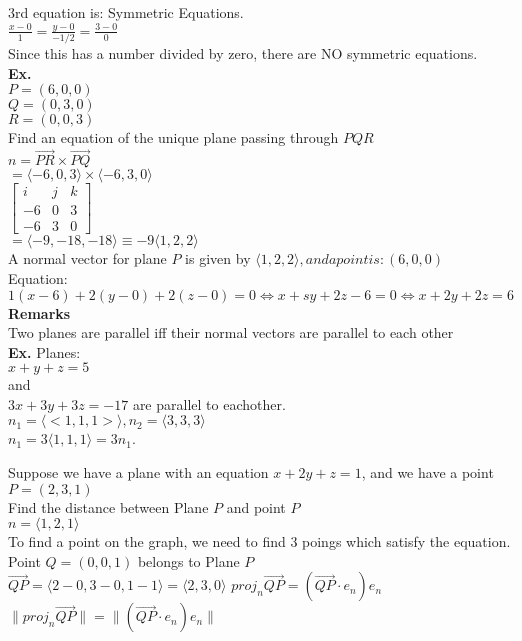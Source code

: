 \documentclass[]{article}
\begin{document}
3rd equation is: Symmetric Equations.\\
$\frac{x-0}{1} = \frac{y-0}{-1/2} = \frac{3-0}{0}$\\
Since this has a number divided by zero, there are NO symmetric equations.\\

\textbf{Ex.}\\
$P = (6, 0, 0)$\\
$Q = (0, 3, 0)$\\
$R= (0, 0, 3)$\\

Find an equation of the unique plane passing through $PQR$\\
$n = \overrightarrow{PR} \times \overrightarrow{PQ}$\\
$= \langle -6, 0, 3\rangle \times \langle -6,3,0 \rangle$\\
$\begin{bmatrix}
    i&j&k\\
    -6&0&3\\
    -6&3&0
\end{bmatrix}$\\
$= \langle -9, -18, -18\rangle \equiv -9\langle{1,2,2}\rangle$\\
A normal vector for plane $P$ is given by $\langle{1,2,2}\rangle, and a point is: (6,0,0)$\\
Equation: $1(x-6)+2(y-0)+2(z-0)=0 \Leftrightarrow x+sy+2z-6=0 \Leftrightarrow x+2y+2z=6$\\

\textbf{Remarks}\\Two planes are parallel iff their normal vectors are parallel to each other\\
\textbf{Ex.} Planes:\\
$x + y + z = 5$ \\
and\\
$3x+3y+3z=-17$
are parallel to eachother.\\
$n_1 = \langle <1,1,1> \rangle, n_2=\langle3,3,3\rangle$\\
$n_1=3\langle{1,1,1}\rangle = 3n_1$.

Suppose we have a plane with an equation $x+2y+z=1$, and we have a point $P = (2, 3, 1)$\\
Find the distance between Plane $P$ and point $P$\\
$n = \langle{1,2,1}\rangle$\\
To find a point on the graph, we need to find 3 poings which satisfy the equation.
Point $Q = (0,0,1)$ belongs to Plane $P$\\
$\overrightarrow{QP} = \langle{2-0,3-0,1-1}\rangle = \langle{2,3,0}\rangle$
$proj_n\overrightarrow{QP}=(\overrightarrow{QP}\cdot e_n)e_n$\\
$\|proj_n\overrightarrow{QP}\| = \|(\overrightarrow{QP}\cdot e_n)e_n\|$\\
\end{document}
